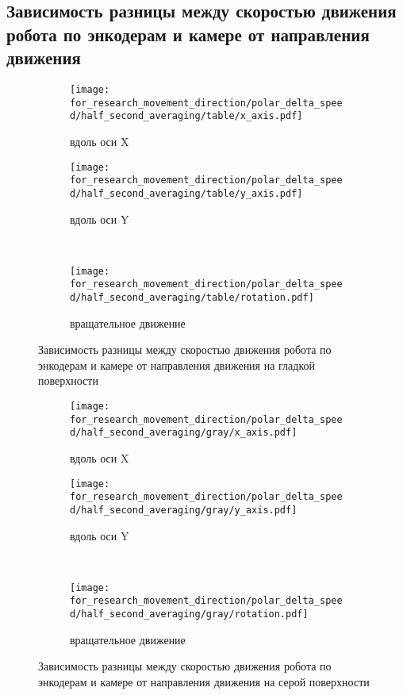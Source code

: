 \subsection{Зависимость разницы между скоростью движения робота по энкодерам и камере от направления движения}

\begin{figure}[H]
    \centering
    \begin{subfigure}{0.49\textwidth}
        \centering
        \texttt{[image: for\_research\_movement\_direction/polar\_delta\_speed/half\_second\_averaging/table/x\_axis.pdf]}
        \caption{вдоль оси X}
    \end{subfigure}
    \hspace{0.005\textwidth}
    \begin{subfigure}{0.49\textwidth}
        \centering
        \texttt{[image: for\_research\_movement\_direction/polar\_delta\_speed/half\_second\_averaging/table/y\_axis.pdf]}
        \caption{вдоль оси Y}
    \end{subfigure} \\
    \vspace{4pt}
    \centering
    \begin{subfigure}{0.49\textwidth}
        \centering
        \texttt{[image: for\_research\_movement\_direction/polar\_delta\_speed/half\_second\_averaging/table/rotation.pdf]}
        \caption{вращательное движение}
    \end{subfigure}
    \caption{Зависимость разницы между скоростью движения робота по энкодерам и камере от направления движения на гладкой поверхности}
\end{figure}

\begin{figure}[H]
    \centering
    \begin{subfigure}{0.49\textwidth}
        \centering
        \texttt{[image: for\_research\_movement\_direction/polar\_delta\_speed/half\_second\_averaging/gray/x\_axis.pdf]}
        \caption{вдоль оси X}
    \end{subfigure}
    \hspace{0.005\textwidth}
    \begin{subfigure}{0.49\textwidth}
        \centering
        \texttt{[image: for\_research\_movement\_direction/polar\_delta\_speed/half\_second\_averaging/gray/y\_axis.pdf]}
        \caption{вдоль оси Y}
    \end{subfigure} \\
    \vspace{4pt}
    \centering
    \begin{subfigure}{0.49\textwidth}
        \centering
        \texttt{[image: for\_research\_movement\_direction/polar\_delta\_speed/half\_second\_averaging/gray/rotation.pdf]}
        \caption{вращательное движение}
    \end{subfigure}
    \caption{Зависимость разницы между скоростью движения робота по энкодерам и камере от направления движения на серой поверхности}
\end{figure}

